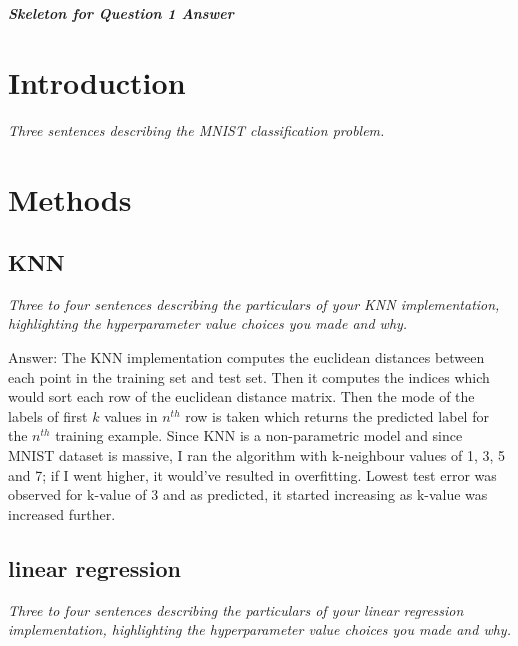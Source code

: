\documentclass{article}
\def\ans#1{\par\gre{Answer: #1}}{}
\def\gre#1{{\color{gre}#1}}
\begin{document}
{\small


}
\newpage



%
%
{\em \bf Skeleton for Question 1 Answer}

\section{Introduction}

\emph{Three sentences describing the MNIST classification problem.}
\section{Methods}
\subsection{KNN}
\emph{Three to four sentences describing the particulars of your KNN implementation, highlighting the hyperparameter value choices you made and why.}
\ans{The KNN implementation computes the euclidean distances between each point in the training set and test set. Then it computes the indices which would sort each row of the euclidean distance matrix. Then the mode of the labels of first $k$ values in $n^{th}$ row is taken which returns the predicted label for the $n^{th}$ training example. Since KNN is a non-parametric model and since MNIST dataset is massive, I ran the algorithm with k-neighbour values of 1, 3, 5 and 7; if I went higher, it would've resulted in overfitting. Lowest test error was observed for k-value of 3 and as predicted, it started increasing as k-value was increased further.}
\subsection{linear regression}
\emph{Three to four sentences describing the particulars of your linear regression implementation, highlighting the hyperparameter value choices you made and why.}
\end{document}
